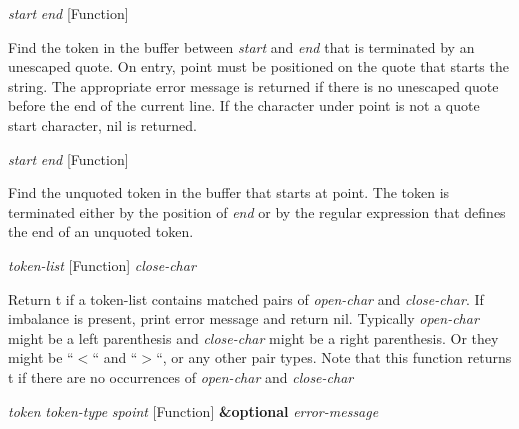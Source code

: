 \vspace{1em}
\noindent
{}
\usebox{\funcname}\emph{start} \emph{end}
 \hfill [Function]

\begin{doc-string}
Find the token in the buffer between \emph{start} and \emph{end} that is terminated by an
unescaped quote.  On entry, point must be positioned on the quote that starts
the string.  The appropriate error message is returned if there is no unescaped
quote before the end of the current line.  If the character under point is not a
quote start character, nil is returned.
\end{doc-string}

\vspace{1em}
\noindent
{}
\usebox{\funcname}\emph{start} \emph{end}
 \hfill [Function]

\begin{doc-string}
Find the unquoted token in the buffer that starts at point.  The token is
terminated either by the position of \emph{end} or by the regular expression that
defines the end of an unquoted token.
\end{doc-string}

\vspace{1em}
\noindent
{}
\usebox{\funcname}\emph{token-list}
 \hfill [Function]
\hspace*{\wd\funcname}\emph{close-char}

\begin{doc-string}
Return t if a token-list contains matched pairs of \emph{open-char} and \emph{close-char}.
If imbalance is present, print error message and return nil.  Typically \emph{open-char}
might be a left parenthesis and \emph{close-char} might be a right parenthesis.  Or they
might be ``$<$`` and ``$>$``, or any other pair types.  Note that this function
returns t if there are no occurrences of \emph{open-char} and \emph{close-char}
\end{doc-string}

\vspace{1em}
\noindent
{}
\usebox{\funcname}\emph{token} \emph{token-type} \emph{spoint}
 \hfill [Function]
\hspace*{\wd\funcname}\textbf{\&optional} \emph{error-message}

